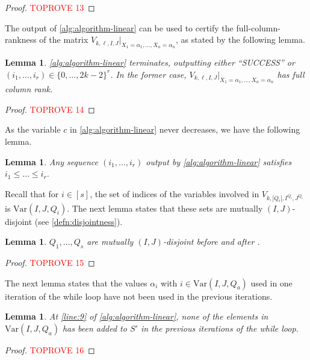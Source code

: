 \documentclass[11pt]{article}
\theoremstyle{plain}
\newtheorem{lemma}[thm]{Lemma}
\theoremstyle{definition}
\theoremstyle{remark}
\newcommand{\var}{\mathrm{Var}}
\begin{document}
\begin{proof}\textcolor{red}{TOPROVE 13}\end{proof}

The output of \cref{alg:algorithm-linear} can be used to certify the full-column-rankness of the matrix $V_{k,\ell,I,J}|_{X_1=\alpha_1,\dots,X_n=\alpha_n}$, as stated by the following lemma.

\begin{lemma}\label{lem:terminate} 
\cref{alg:algorithm-linear} terminates, outputting either ``SUCCESS'' or $(i_1,\dots,i_r)\in\{0,\dots,2k-2\}^r$. In the former case, $V_{k,\ell,I,J}|_{X_1=\alpha_1,\dots,X_n=\alpha_n}$ has full column rank. 
\end{lemma}

\begin{proof}\textcolor{red}{TOPROVE 14}\end{proof}

As the variable $c$ in \cref{alg:algorithm-linear} never decreases, we have the following lemma.

\begin{lemma}\label{lem:output}
Any sequence $(i_1,\dots,i_r)$ output by \cref{alg:algorithm-linear} satisfies $i_1\leq \dots\leq i_r$.
\end{lemma}

Recall that for $i\in [s]$, the set of indices of the variables involved in $V_{k,|Q_i|,I^{Q_i},J^{Q_i}}$ is $\var(I,J,Q_i)$.
The next lemma states that these sets are mutually $(I,J)$-disjoint (see \cref{defn:disjointness}).

\begin{lemma}\label{lem:disjoint}
$Q_1,\dots,Q_s$ are mutually $(I,J)$-disjoint before and after .
\end{lemma}

\begin{proof}\textcolor{red}{TOPROVE 15}\end{proof}

The next lemma states that the
values $\alpha_i$ with $i\in\var(I,J,Q_a)$ used in one iteration of the while loop have not been used in the previous iterations.

\begin{lemma}\label{lem:new-elements}
At \cref{line:9} of \cref{alg:algorithm-linear}, none of the elements in $\var(I,J,Q_a)$ has been added to $S'$ in the previous iterations of the while loop.
\end{lemma}

\begin{proof}\textcolor{red}{TOPROVE 16}\end{proof}
\end{document}
